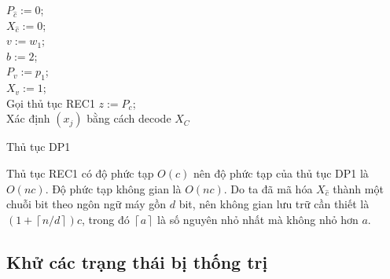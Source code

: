 \begin{algorithm}[H]
    \DontPrintSemicolon
    \vspace{1em}
    \vspace{1em}
    {
        $P_{\hat{c}} := 0$;\\
        $X_{\hat{c}} := 0$;\\
    }
    $v := w_1$;\\
    $b := 2$;\\
    $P_v := p_1$;\\
    $X_v := 1$;\\
    {
        Gọi thủ tục REC1
    }
    $z := P_c$;\\
    Xác định $(x_j)$ bằng cách decode $X_C$
    \caption{Thủ tục DP1}
    \label{algo:dp1}
\end{algorithm}

Thủ tục REC1 có độ phức tạp $O(c)$ nên độ phức tạp của thủ tục DP1 là $O(nc)$. Độ phức tạp không gian là $O(nc)$. Do ta đã mã hóa $X_{\hat{c}}$ thành một chuỗi bit theo ngôn ngữ máy gồn $d$ bit, nên không gian lưu trữ cần thiết là $(1 +\left \lceil n/d  \right \rceil)c$, trong đó $\left \lceil a\right \rceil$ là số nguyên nhỏ nhất mà không nhỏ hơn $a$.

\subsection{Khử các trạng thái bị thống trị}

